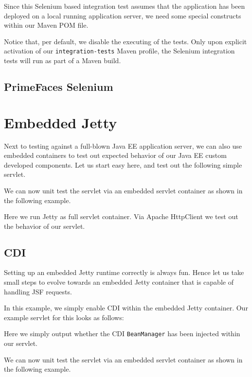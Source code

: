 Since this Selenium based integration test assumes that the application has been deployed on a local running application server, we need some special constructs within our Maven POM file.

Notice that, per default, we disable the executing of the tests.
Only upon explicit activation of our \texttt{integration-tests} Maven profile,
the Selenium integration tests will run as part of a Maven build.

\subsection{PrimeFaces Selenium}

\section{Embedded Jetty}
Next to testing against a full-blown Java EE application server, we can also use embedded containers to test out expected behavior of our Java EE custom developed components.
Let us start easy here, and test out the following simple servlet.


We can now unit test the servlet via an embedded servlet container as shown in the following example.

Here we run Jetty \cite{jetty} as full servlet container.
Via Apache HttpClient \cite{httpclient} we test out the behavior of our servlet.

\subsection{CDI}
Setting up an embedded Jetty runtime correctly is always fun.
Hence let us take small steps to evolve towards an embedded Jetty container that is capable of handling JSF requests.

In this example, we simply enable CDI within the embedded Jetty container.
Our example servlet for this looks as follows:

Here we simply output whether the CDI \texttt{BeanManager} has been injected within our servlet.

We can now unit test the servlet via an embedded servlet container as shown in the following example.
